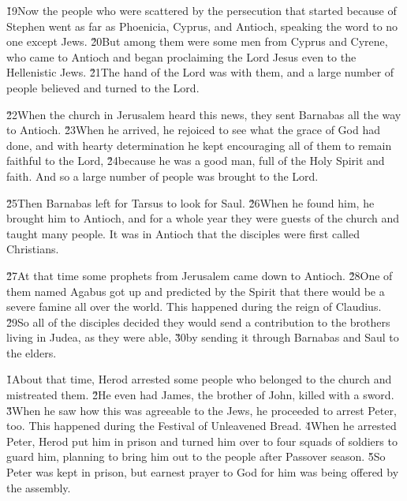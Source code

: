 \v{19}Now the people who were scattered by the persecution that started because of Stephen went as far as Phoenicia, Cyprus, and Antioch, speaking the word to no one except Jews. \v{20}But among them were some men from Cyprus and Cyrene, who came to Antioch and began proclaiming the Lord Jesus even to the Hellenistic Jews. \v{21}The hand of the Lord was with them, and a large number of people believed and turned to the Lord.

\v{22}When the church in Jerusalem heard this news, they sent Barnabas all the way to Antioch. \v{23}When he arrived, he rejoiced to see what the grace of God had done, and with hearty determination he kept encouraging all of them to remain faithful to the Lord, \v{24}because he was a good man, full of the Holy Spirit and faith. And so a large number of people was brought to the Lord.

\v{25}Then Barnabas left for Tarsus to look for Saul. \v{26}When he found him, he brought him to Antioch, and for a whole year they were guests of the church and taught many people. It was in Antioch that the disciples were first called Christians.

\v{27}At that time some prophets from Jerusalem came down to Antioch. \v{28}One of them named Agabus got up and predicted by the Spirit that there would be a severe famine all over the world. This happened during the reign of Claudius. \v{29}So all of the disciples decided they would send a contribution to the brothers living in Judea, as they were able, \v{30}by sending it through Barnabas and Saul to the elders.

\v{1}About that time, Herod arrested some people who belonged to the church and mistreated them. \v{2}He even had James, the brother of John, killed with a sword. \v{3}When he saw how this was agreeable to the Jews, he proceeded to arrest Peter, too. This happened during the Festival of Unleavened Bread. \v{4}When he arrested Peter, Herod put him in prison and turned him over to four squads of soldiers to guard him, planning to bring him out to the people after Passover season. \v{5}So Peter was kept in prison, but earnest prayer to God for him was being offered by the assembly.

